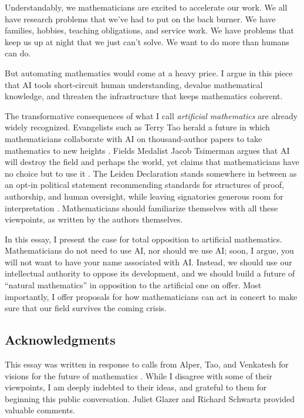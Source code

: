 \documentclass[12pt]{amsart}
\theoremstyle{definition}
\begin{document}
Understandably, we mathematicians are excited to accelerate our work. We all have research problems that we’ve had to put on the back burner. We have families, hobbies, teaching obligations, and service work. We have problems that keep us up at night that we just can't solve. We want to do more than humans can do.

But automating mathematics would come at a heavy price. I argue in this piece that AI tools short-circuit human understanding, devalue mathematical knowledge, and threaten the infrastructure that keeps mathematics coherent.

The transformative consequences of what I call \emph{artificial mathematics} are already widely recognized. Evangelists such as Terry Tao herald a future in which mathematicians collaborate with AI on thousand-author papers to take mathematics to new heights \cite{quantatao, taoicm}. Fields Medalist Jacob Tsimerman argues that AI will destroy the field and perhaps the world, yet claims that mathematicians have no choice but to use it \cite{omnicide, quantatsimerman}. The Leiden Declaration stands somewhere in between as an opt-in political statement recommending standards for structures of proof, authorship, and human oversight, while leaving signatories generous room for interpretation \cite{leiden}. Mathematicians should familiarize themselves with all these viewpoints, as written by the authors themselves.



In this essay, I present the case for total opposition to artificial mathematics. Mathematicians do not need to use AI, nor should we use AI; soon, I argue, you will not want to have your name associated with AI. Instead, we should use our intellectual authority to oppose its development, and we should build a future of ``natural mathematics'' in opposition to the artificial one on offer. Most importantly, I offer proposals for how mathematicians can act in concert to make sure that our field survives the coming crisis.

\subsection*{Acknowledgments}
This essay was written in response to calls from Alper, Tao, and Venkatesh for visions for the future of mathematics \cite{MR5059809, taoicm, MR4726987}. While I disagree with some of their viewpoints, I am deeply indebted to their ideas, and grateful to them for beginning this public conversation. Juliet Glazer and Richard Schwartz provided valuable comments.
\end{document}
